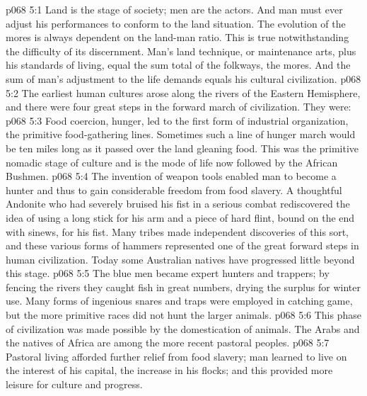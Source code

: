 \vs p068 5:1 Land is the stage of society; men are the actors. And man must ever adjust his performances to conform to the land situation. The evolution of the mores is always dependent on the land\hyp{}man ratio. This is true notwithstanding the difficulty of its discernment. Man’s land technique, or maintenance arts, plus his standards of living, equal the sum total of the folkways, the mores. And the sum of man’s adjustment to the life demands equals his cultural civilization.
\vs p068 5:2 The earliest human cultures arose along the rivers of the Eastern Hemisphere, and there were four great steps in the forward march of civilization. They were:
\pc \vs p068 5:3 \bibnobreakspace {} Food coercion, hunger, led to the first form of industrial organization, the primitive food\hyp{}gathering lines. Sometimes such a line of hunger march would be ten miles long as it passed over the land gleaning food. This was the primitive nomadic stage of culture and is the mode of life now followed by the African Bushmen.
\pc \vs p068 5:4 \bibnobreakspace {} The invention of weapon tools enabled man to become a hunter and thus to gain considerable freedom from food slavery. A thoughtful Andonite who had severely bruised his fist in a serious combat rediscovered the idea of using a long stick for his arm and a piece of hard flint, bound on the end with sinews, for his fist. Many tribes made independent discoveries of this sort, and these various forms of hammers represented one of the great forward steps in human civilization. Today some Australian natives have progressed little beyond this stage.
\vs p068 5:5 The blue men became expert hunters and trappers; by fencing the rivers they caught fish in great numbers, drying the surplus for winter use. Many forms of ingenious snares and traps were employed in catching game, but the more primitive races did not hunt the larger animals.
\pc \vs p068 5:6 \bibnobreakspace {} This phase of civilization was made possible by the domestication of animals. The Arabs and the natives of Africa are among the more recent pastoral peoples.
\vs p068 5:7 Pastoral living afforded further relief from food slavery; man learned to live on the interest of his capital, the increase in his flocks; and this provided more leisure for culture and progress.
